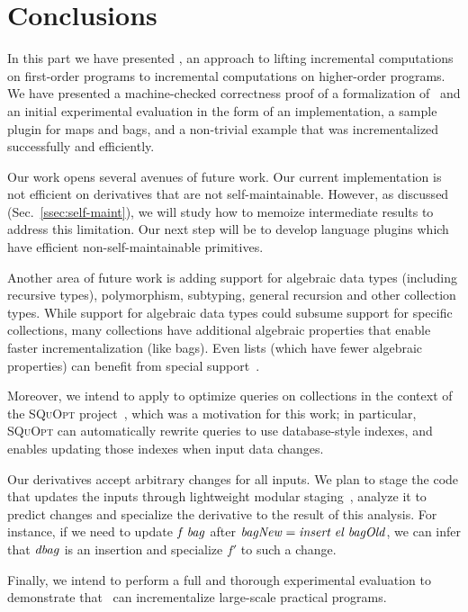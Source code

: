 \chapter{Conclusions}
\label{ssec:future}
In this part we have presented \ILC, an approach to lifting incremental computations
on first-order programs to incremental computations on higher-order
programs. We have presented a machine-checked correctness proof 
of a formalization of \ILC\ and an initial experimental evaluation
in the form of an implementation, a sample plugin for maps and bags,
and a non-trivial example that was incrementalized successfully and
efficiently. 

Our work opens several avenues of future work. Our current implementation
is not efficient on derivatives that are not self-maintainable.
However, as discussed
(Sec.~\ref{ssec:self-maint}), we will study how
to memoize intermediate results to address this limitation. Our next
step will be to develop language plugins which
have efficient non-self-maintainable primitives.

Another area of future work is adding support for algebraic data
types (including recursive types), polymorphism, subtyping, general recursion
and other collection types. While support for algebraic data
types could subsume support for specific collections, many
collections have additional algebraic properties that enable faster
incrementalization (like bags). Even lists (which have fewer algebraic properties)
can benefit from special support~\citep{Maier2013}.

Moreover, we intend to apply \ILC{} to optimize queries on
collections in the context of the \textsc{SQuOpt}
project~\citep{GiarrussoAOSD13}, which was a motivation for this
work; in particular, \textsc{SQuOpt} can automatically rewrite
queries to use database-style indexes, and \ILC{} enables
updating those indexes when input data changes.

\begin{oldSec}
Our derivatives accept arbitrary changes for all inputs. We plan
to stage the code that updates the inputs through lightweight
modular staging~\citep{rompf2010lightweight}, analyze it to
predict changes and specialize the derivative to the result of
this analysis. For instance, if we need to update $\mathit{f} \;
\mathit{bag}$ after $\mathit{bagNew} = \mathit{insert} \; \mathit{el} \;
\mathit{bagOld}$, we can infer that $\mathit{dbag}$ is an insertion
and specialize $f'$ to such a change.
\end{oldSec}

Finally, we intend to perform a full and thorough experimental evaluation
to demonstrate that \ILC\ can incrementalize large-scale practical programs.
